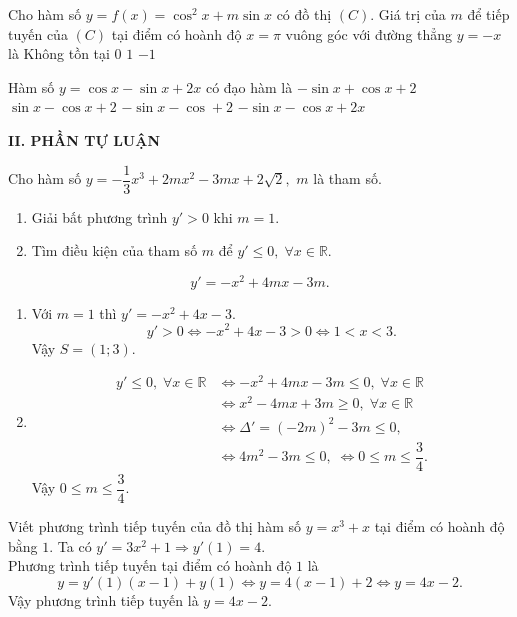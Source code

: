 \begin{ex}%
	Cho hàm số $ y=f(x)=\cos^2x+m\sin x $ có đồ thị $ (C) $. Giá trị của $ m $ để tiếp tuyến của $ (C) $ tại điểm có hoành độ $ x=\pi $ vuông góc với đường thẳng $ y=-x $ là
	\choice
	{Không tồn tại}
	{$0$}
	{$1$}
	{\True $-1$}
\end{ex}

\begin{ex}%
	Hàm số $ y=\cos x-\sin x+2x $  có đạo hàm là
	\choice
	{$-\sin x+\cos x+2$}
	{$\sin x-\cos x+2$}
	{\True $-\sin x-\cos+2$}
	{$-\sin x-\cos x+2x$}
\end{ex}


\noindent\textbf{II. PHẦN TỰ LUẬN}
\begin{bt}%
	Cho hàm số $ y=-\dfrac{1}{3}x^3+2mx^2-3mx+2\sqrt{2} ,$\; $ m $ là tham số.
	\begin{enumerate}
		\item Giải bất phương trình $ y'>0 $ khi $ m=1. $
		\item Tìm điều kiện của tham số $ m $ để $ y'\le 0,\;\forall x\in\mathbb{R}. $
	\end{enumerate}
	\loigiai
	{$$y'=-x^2+4mx-3m.$$
	\begin{enumerate}
	\item Với $m=1$ thì $y'=-x^2+4x-3.$
	$$y'>0\Leftrightarrow-x^2+4x-3>0\Leftrightarrow 1<x<3.$$ Vậy $S=(1;3).$
	\item \begin{align*}
	y'\le 0,\;\forall x\in \mathbb{R}&\Leftrightarrow -x^2+4mx-3m\le 0,\;\forall x\in\mathbb{R}\\&\Leftrightarrow x^2-4mx+3m\ge 0,\;\forall x\in\mathbb{R}\\ &\Leftrightarrow\Delta'=(-2m)^2-3m\le 0,\;\\&\Leftrightarrow 4m^2-3m\le 0,\; \Leftrightarrow 0\le m\le \dfrac{3}{4}.
	\end{align*}
	Vậy $0\le m\le \dfrac{3}{4}.$
	\end{enumerate}
	}
\end{bt}

\begin{bt}%
Viết phương trình tiếp tuyến của đồ thị hàm số $ y=x^3+x $ tại điểm có hoành độ bằng $ 1. $
	\loigiai
	{Ta có $y'=3x^2+1\Rightarrow y'(1)=4.$\\Phương trình tiếp tuyến tại điểm có hoành độ $1$ là $$y=y'(1)(x-1)+y(1)\Leftrightarrow y=4(x-1)+2\Leftrightarrow y=4x-2.$$
	Vậy phương trình tiếp tuyến là $y=4x-2.$
	}
\end{bt}

